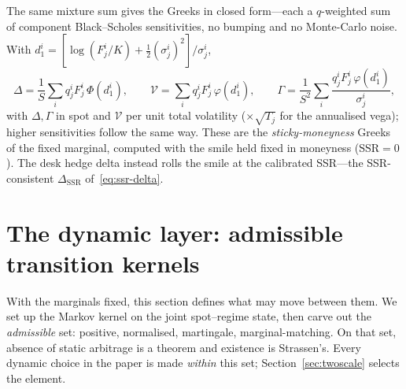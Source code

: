 \documentclass[11pt]{article}
\newcommand{\SSR}{\mathrm{SSR}}
\begin{document}
The same mixture sum gives the Greeks in closed form---each a $q$-weighted sum of component
Black--Scholes sensitivities, no bumping and no Monte-Carlo noise. With
$d_1^i=[\log(F_j^i/K)+\tfrac12(\sigma_j^i)^2]/\sigma_j^i$,
\begin{equation}
\Delta=\frac1{S}\sum_i q_j^i F_j^i\,\Phi(d_1^i),\qquad
\mathcal V=\sum_i q_j^i F_j^i\,\varphi(d_1^i),\qquad
\Gamma=\frac1{S^2}\sum_i \frac{q_j^i F_j^i\,\varphi(d_1^i)}{\sigma_j^i},
\label{eq:mix-greeks}
\end{equation}
with $\Delta,\Gamma$ in spot and $\mathcal V$ per unit total volatility ($\times\sqrt{T_j}$ for
the annualised vega); higher sensitivities follow the same way. These are the
\emph{sticky-moneyness} Greeks of the fixed marginal, computed with the smile held fixed in
moneyness ($\SSR=0$). The desk hedge delta instead rolls the smile at the calibrated
SSR---the SSR-consistent $\Delta_{\SSR}$ of~\eqref{eq:ssr-delta}.

\section{The dynamic layer: admissible transition kernels}
\label{sec:kernel}

With the marginals fixed, this section defines what may move between them. We set up the
Markov kernel on the joint spot--regime state, then carve out the \emph{admissible}
set: positive, normalised, martingale, marginal-matching. On that set, absence of static
arbitrage is a theorem and existence is Strassen's. Every dynamic choice in the paper is
made \emph{within} this set; Section~\ref{sec:twoscale} selects the element.
\end{document}
